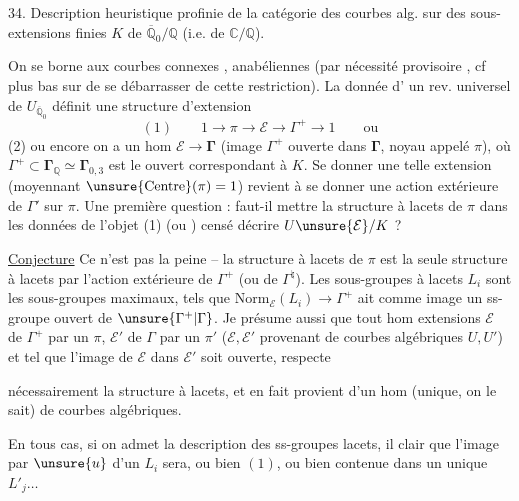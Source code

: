 34. Description heuristique profinie de la catégorie
des courbes alg.  sur  des sous-
extensions finies $K$ de $\overline{\mathbb Q}_0/\mathbb Q$ (i.e. de $\mathbb C/\mathbb Q$).

On se borne aux courbes  connexes , anabéliennes
(par nécessité provisoire \unsure{!}, cf plus bas sur  de
se débarrasser de cette restriction). La donnée d'
un rev. universel de  $U_{\overline{\mathbb Q}_0}$ définit une
structure d'extension
\[
(1)\qquad 1\longrightarrow\pi\longrightarrow\mathcal E\longrightarrow\Gamma^{+}\longrightarrow1\qquad\text{ou}
\]
(2) ou encore on a un hom $\mathcal E\longrightarrow\boldsymbol{\Gamma}$
(image $\Gamma^{+}$ ouverte dans $\boldsymbol{\Gamma}$,
noyau appelé $\pi$),
où $\Gamma^{+}\subset\boldsymbol{\Gamma}_{\mathbb Q}\simeq\boldsymbol{\Gamma}_{0,3}$ est le  ouvert
correspondant à $K$. Se donner une telle
extension (moyennant $\unsure{\mathrm{Centre}}(\pi)=1$) revient à
se donner une action extérieure de $\Gamma'$ sur $\pi$.
Une première question : faut-il mettre la
structure à lacets de $\pi$ dans les  données  de
l'objet (1) (ou ) censé décrire $U\unsure{\mathcal E}/K$ ?

\uline{Conjecture} Ce n'est pas la peine -- la structure à lacets
de $\pi$ est la seule structure à lacets 
par l'action extérieure de $\Gamma^{+}$ (ou de $\Gamma^{\natural}$). Les
sous-groupes à lacets $L_i$ sont les sous-groupes
maximaux, tels que $\mathrm{Norm}_{\mathcal E}(L_i)\longrightarrow\Gamma^{+}$ ait
comme image un ss-groupe ouvert de $\unsure{\Gamma^{+}|\Gamma}$.
Je
présume aussi que tout hom  extensions
$\mathcal E$ de $\Gamma^{+}$ par un $\pi$, $\mathcal E'$ de $\Gamma$ par un $\pi'$
($\mathcal E,\mathcal E'$ provenant de courbes algébriques $U,U'$) et tel
que l'image de $\mathcal E$ dans $\mathcal E'$ soit ouverte, respecte

nécessairement la structure à lacets, et en fait
provient d'un hom (unique, on le sait) de courbes
algébriques.

En tous cas, si on admet la description des
ss-groupes lacets, il  clair que l'image par
$\unsure{u}$ d'un $L_i$ sera, ou bien $(1)$, ou bien contenue
dans un unique $L'_j\ldots$

